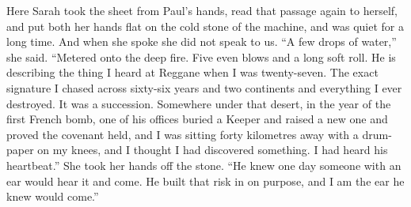 \ornament

Here Sarah took the sheet from Paul's hands, read that passage again to herself, and put both her hands flat on the cold stone of the machine, and was quiet for a long time. And when she spoke she did not speak to us. ``A few drops of water,'' she said. ``Metered onto the deep fire. Five even blows and a long soft roll. He is describing the thing I heard at Reggane when I was twenty-seven. The exact signature I chased across sixty-six years and two continents and everything I ever destroyed. It was a succession. Somewhere under that desert, in the year of the first French bomb, one of his offices buried a Keeper and raised a new one and proved the covenant held, and I was sitting forty kilometres away with a drum-paper on my knees, and I thought I had discovered something. I had heard his heartbeat.'' She took her hands off the stone. ``He knew one day someone with an ear would hear it and come. He built that risk in on purpose, and I am the ear he knew would come.''\par

\ornament

